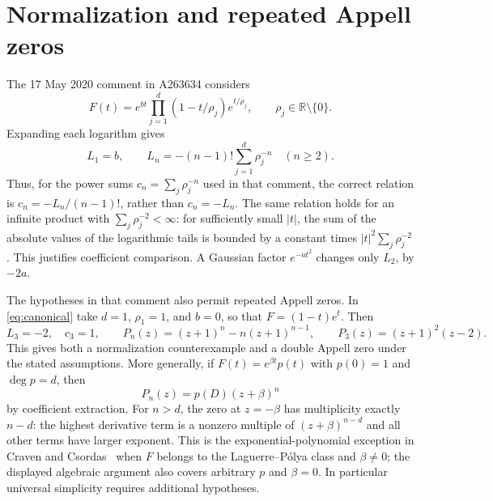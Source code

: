 \documentclass[11pt]{article}
\begin{document}
\section{Normalization and repeated Appell zeros}
The 17 May 2020 comment in A263634 considers
\begin{equation}\label{eq:canonical}
 F(t)=e^{bt}\prod_{j=1}^d(1-t/\rho_j)e^{t/\rho_j},
 \qquad \rho_j\in\mathbb R\setminus\{0\}.
\end{equation}
Expanding each logarithm gives
\begin{equation}\label{eq:normalization}
 L_1=b,\qquad L_n=-(n-1)!\sum_{j=1}^d\rho_j^{-n}\quad(n\geq2).
\end{equation}
Thus, for the power sums $c_n=\sum_j\rho_j^{-n}$ used in that
comment, the correct relation is $c_n=-L_n/(n-1)!$, rather than
$c_n=-L_n$. The same relation holds for an infinite product with
$\sum_j\rho_j^{-2}<\infty$: for sufficiently small $|t|$, the sum
of the absolute values of the logarithmic tails is bounded by a
constant times $|t|^2\sum_j\rho_j^{-2}$. This justifies coefficient
comparison. A Gaussian factor $e^{-at^2}$ changes only $L_2$, by
$-2a$.

The hypotheses in that comment also permit repeated Appell zeros.
In \eqref{eq:canonical} take $d=1$, $\rho_1=1$, and $b=0$, so that
$F=(1-t)e^t$. Then
\[
 L_3=-2,\quad c_3=1,\qquad
 P_n(z)=(z+1)^n-n(z+1)^{n-1},\qquad
 P_3(z)=(z+1)^2(z-2).
\]
This gives both a normalization counterexample and a double Appell
zero under the stated assumptions. More generally, if
$F(t)=e^{\beta t}p(t)$ with $p(0)=1$ and $\deg p=d$, then
\begin{equation}\label{eq:multiplicity}
 P_n(z)=p(D)(z+\beta)^n
\end{equation}
by coefficient extraction. For $n>d$, the zero at $z=-\beta$
has multiplicity exactly $n-d$: the highest derivative
term is a nonzero multiple of $(z+\beta)^{n-d}$ and all other
terms have larger exponent. This is the exponential-polynomial
exception in Craven and Csordas~\cite[Proposition 4.1(2)]{craven}
when $F$ belongs to the Laguerre--P\'olya class and $\beta\ne0$;
the displayed algebraic argument also covers arbitrary $p$ and $\beta=0$.
In particular universal simplicity requires additional hypotheses.
\end{document}
